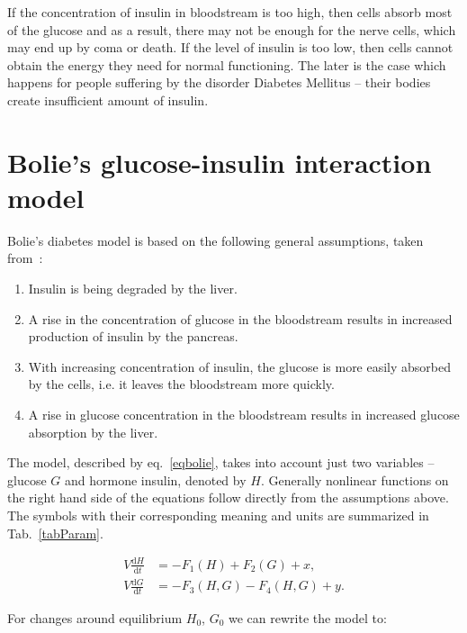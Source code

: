 \documentclass{article}
\providecommand{\m}[1]{\ensuremath{\mathrm{#1}}}
\begin{document}
If the concentration of insulin in bloodstream is too high, then cells absorb most of the glucose 
and as a result, there may not be enough for the nerve cells, which may end up by coma or death.
If the level of insulin is too low, then cells cannot obtain the energy they need for normal functioning.
The later is the case which happens for people suffering by the disorder Diabetes Mellitus -- their bodies
create insufficient amount of insulin.


\section{Bolie's glucose-insulin interaction model}

Bolie's diabetes model is based on the following general assumptions, taken from~\cite{fulford_modelling_1997}:

\begin{enumerate}
	\item
	Insulin is being degraded by the liver.	
	\item
	A rise in the concentration of glucose in the bloodstream results in increased production of insulin by the pancreas.
	\item
	With increasing concentration of insulin, the glucose is more easily absorbed by the cells, i.e. it leaves the bloodstream more quickly.
	\item
	A rise in glucose concentration in the bloodstream results in increased glucose absorption by the liver.

\end{enumerate}


The model, described by eq.~\ref{eqbolie}, takes into account just two variables -- glucose $G$ and hormone insulin, denoted by $H$. Generally nonlinear functions on the right hand side of the equations follow directly from the assumptions above. The symbols with their corresponding meaning and units are summarized in Tab.~\ref{tabParam}. 

\begin{equation}
\label{eqbolie}
\begin{aligned}
V\frac{\m{d} H}{\m{d} t}&=-F_1(H)+F_2(G)+ x,\\
V\frac{\m{d} G}{\m{d} t}&=-F_3(H,G)-F_4(H,G) + y. 
\end{aligned}
\end{equation}

For changes around equilibrium $H_0$, $G_0$ we can rewrite the model to:
\end{document}
